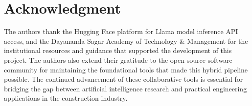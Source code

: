 \documentclass[10pt, twocolumn, letterpaper]{article}
\begin{document}
\section*{Acknowledgment}
The authors thank the Hugging Face platform for Llama model inference API access, and the Dayananda Sagar Academy of Technology \& Management for the institutional resources and guidance that supported the development of this project. The authors also extend their gratitude to the open-source software community for maintaining the foundational tools that made this hybrid pipeline possible. The continued advancement of these collaborative tools is essential for bridging the gap between artificial intelligence research and practical engineering applications in the construction industry.

%
\end{document}
